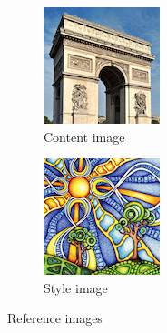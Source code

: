 \documentclass[twocolumn,superscriptaddress,aps, floatfix]{revtex4-1}
\begin{document}
    \begin{figure}[ht]
        \centering
        \begin{subfigure}[b]{0.22\textwidth}
            \centering
            \includegraphics[width=\textwidth]{resources/png/inputs/paris.png}
            \caption{Content image}
            \label{fig:input.image.ref.content}
        \end{subfigure}
        \hfill
        \begin{subfigure}[b]{0.22\textwidth}
            \centering
            \includegraphics[width=\textwidth]{resources/png/inputs/sun-trees.png}
            \caption{Style image}
            \label{input.image.ref.style}
        \end{subfigure}
        \caption{Reference images}
    \end{figure}
    
\end{document}
